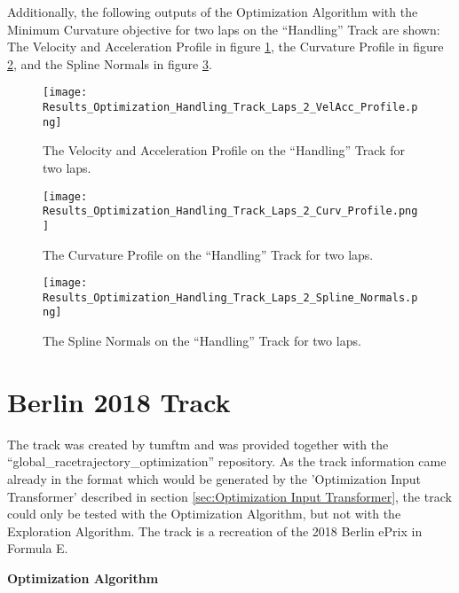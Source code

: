 Additionally, the following outputs of the Optimization Algorithm with the Minimum Curvature objective for two laps on the ``Handling'' Track are shown: The Velocity and Acceleration Profile in figure \ref{fig:Results Handling Track Laps 2 VelAcc Profile}, the Curvature Profile in figure \ref{fig:Results Handling Track Laps 2 Curv Profile}, and the Spline Normals in figure \ref{fig:Results Handling Track Laps 2 Spline Normals}.
\begin{figure}[H]
    \centering
    \texttt{[image: Results\_Optimization\_Handling\_Track\_Laps\_2\_VelAcc\_Profile.png]}
    \caption{The Velocity and Acceleration Profile on the ``Handling'' Track for two laps.}
    \label{fig:Results Handling Track Laps 2 VelAcc Profile}
\end{figure}
\begin{figure}[H]
    \centering
    \texttt{[image: Results\_Optimization\_Handling\_Track\_Laps\_2\_Curv\_Profile.png]}
    \caption{The Curvature Profile on the ``Handling'' Track for two laps.}
    \label{fig:Results Handling Track Laps 2 Curv Profile}
\end{figure}
\begin{figure}[H]
    \centering
    \texttt{[image: Results\_Optimization\_Handling\_Track\_Laps\_2\_Spline\_Normals.png]}
    \caption{The Spline Normals on the ``Handling'' Track for two laps.}
    \label{fig:Results Handling Track Laps 2 Spline Normals}
\end{figure}

\pagebreak

\section{Berlin 2018 Track} \label{sec:Results Berlin 2018 Track}
The track was created by \acrshort{tumftm} and was provided together with the ``global\_racetrajectory\_optimization'' repository. \cite{tumftm_optimization_algoritm}
As the track information came already in the format which would be generated by the 'Optimization Input Transformer' described in section \ref{sec:Optimization Input Transformer}, the track could only be tested with the Optimization Algorithm, but not with the Exploration Algorithm. The track is a recreation of the 2018 Berlin ePrix in Formula E. \cite{formula_e_berlin_eprix}

\textbf{Optimization Algorithm}

